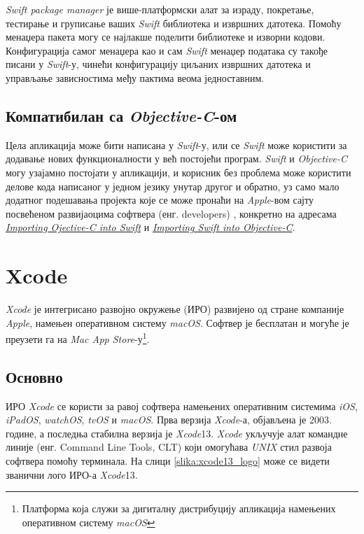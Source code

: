 \documentclass[12pt,oneside]{memoir}
\begin{document}
\textit{Swift package manager} је више-платформски алат за израду, покретање, тестирање и груписање ваших \textit{Swift} библиотека и извршних датотека. Помоћу менаџера пакета могу се најлакше поделити библиотеке и изворни кодови. Конфигурација самог менаџера као и сам \textit{Swift} менаџер података су такође писани у \textit{Swift}-у, чинећи конфигурацију циљаних извршних датотека и управљање зависностима међу пактима веома једноставним. 

\subsection{Компатибилан са \textit{Objective-C}-ом}

Цела апликација може бити написана у \textit{Swift}-у, или се \textit{Swift} може користити за додавање нових функционалности у већ постојећи програм. \textit{Swift} и \textit{Objective-C} могу узајамно постојати у апликацији, и корисник без проблема може користити делове кода написаног у једном језику унутар другог и обратно, уз само мало додатног подешавања пројекта које се може пронаћи на \textit{Apple}-вом сајту посвећеном развијаоцима софтвера (енг. developers) \cite{Apple_Developer}, конкретно на адресама \href{https://developer.apple.com/documentation/swift/imported_c_and_objective-c_apis/importing_objective-c_into_swift}{\textit{Importing Ojective-C into Swift}} и \href{https://developer.apple.com/documentation/swift/imported_c_and_objective-c_apis/importing_swift_into_objective-c}{\textit{Importing Swift into Objective-C}}.

\section{Xcode}
\label{sec:Xcode}

\indent \textit{Xcode} је интегрисано развојно окружење (ИРО) развијено од стране компаније \textit{Apple}, намењен оперативном систему \textit{macOS}. Софтвер је бесплатан и могуће је преузети га на \textit{Mac App Store}-у\footnote{Платформа која служи за дигиталну дистрибуцију апликација намењених оперативном систему \textit{macOS}}.

\subsection{Основно}

\indent ИРО \textit{Xcode} се користи за равој софтвера намењених оперативним системима \textit{iOS}, \textit{iPadOS}, \textit{watchOS}, \textit{tvOS} и \textit{macOS}. Прва верзија \textit{Xcode}-а, објављена је 2003. године, а последња стабилна верзија је \textit{Xcode}13. \textit{Xcode} укључује алат командне линије (енг. Command Line Tools, CLT) који омогућава \textit{UNIX} стил развоја софтвера помоћу терминала. На слици \ref{slika:xcode13_logo} може се видети званични лого ИРО-а \textit{Xcode}13.
\end{document}
